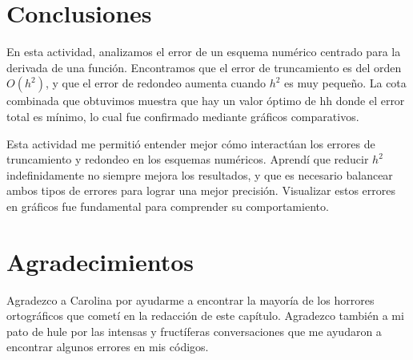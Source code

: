 \documentclass[../portafolio.tex]{subfiles}
\begin{document}
\section*{Conclusiones}
En esta actividad, analizamos el error de un esquema numérico centrado para la derivada de una función. Encontramos que el error de truncamiento es del orden $O(h^2)$, y que el error de redondeo aumenta cuando $h^2$ es muy pequeño. La cota combinada que obtuvimos muestra que hay un valor óptimo de hh donde el error total es mínimo, lo cual fue confirmado mediante gráficos comparativos.

Esta actividad me permitió entender mejor cómo interactúan los errores de truncamiento y redondeo en los esquemas numéricos. Aprendí que reducir $h^2$ indefinidamente no siempre mejora los resultados, y que es necesario balancear ambos tipos de errores para lograr una mejor precisión. Visualizar estos errores en gráficos fue fundamental para comprender su comportamiento.

\section*{Agradecimientos}
Agradezco a Carolina por ayudarme a encontrar la mayoría de los horrores ortográficos que cometí en la redacción de este capítulo. Agradezco también a mi pato de hule por las intensas y fructíferas conversaciones que me ayudaron a encontrar algunos errores en mis códigos.
\end{document}
